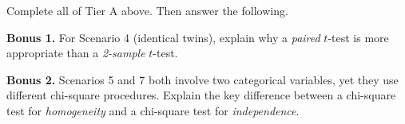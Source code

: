 \documentclass[10pt]{article}
\begin{document}
\begin{tcolorbox}[colback=white, colframe=black!40,
    title=\textbf{Tier E --- Extension},
    fonttitle=\bfseries, arc=2mm, left=3mm, right=3mm, top=2mm, bottom=2mm]

Complete all of Tier A above. Then answer the following.

\vspace{0.08in}
\textbf{Bonus 1.} For Scenario 4 (identical twins), explain why a \textit{paired} $t$-test is
more appropriate than a \textit{2-sample} $t$-test.

\textbf{Bonus 2.} Scenarios 5 and 7 both involve two categorical variables, yet they use
different chi-square procedures. Explain the key difference between a chi-square test for
\textit{homogeneity} and a chi-square test for \textit{independence}.
\end{tcolorbox}
\end{document}
